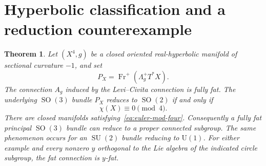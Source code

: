 \documentclass[11pt]{amsart}
\newcommand{\Fr}{\operatorname{Fr}}
\newcommand{\SO}{\operatorname{SO}}
\newcommand{\SU}{\operatorname{SU}}
\theoremstyle{plain}
\newtheorem{theorem}{Theorem}[section]
\theoremstyle{definition}
\theoremstyle{remark}
\begin{document}
\section{Hyperbolic classification and a reduction counterexample}

\begin{theorem}\label{thm:hyperbolic}
Let $(X^4,g)$ be a closed oriented real-hyperbolic manifold of sectional
curvature $-1$, and set
\[
 P_X=\Fr^+(\Lambda^+_gT^*X).
\]
The connection $A_g$ induced by the Levi--Civita connection is fully
fat.  The underlying $\SO(3)$ bundle $P_X$ reduces to $\SO(2)$ if
and only if
\begin{equation}\label{eq:euler-mod-four}
 \chi(X)\equiv0\pmod4.
\end{equation}
There are closed manifolds satisfying~\eqref{eq:euler-mod-four}.
Consequently a fully fat principal $\SO(3)$ bundle can reduce to a
proper connected subgroup.  The same phenomenon occurs for an
$\SU(2)$ bundle reducing to $\mathrm U(1)$.  For either example and
every nonzero $y$ orthogonal to the Lie algebra of the indicated
circle subgroup, the fat connection is $y$-fat.
\end{theorem}
\end{document}

